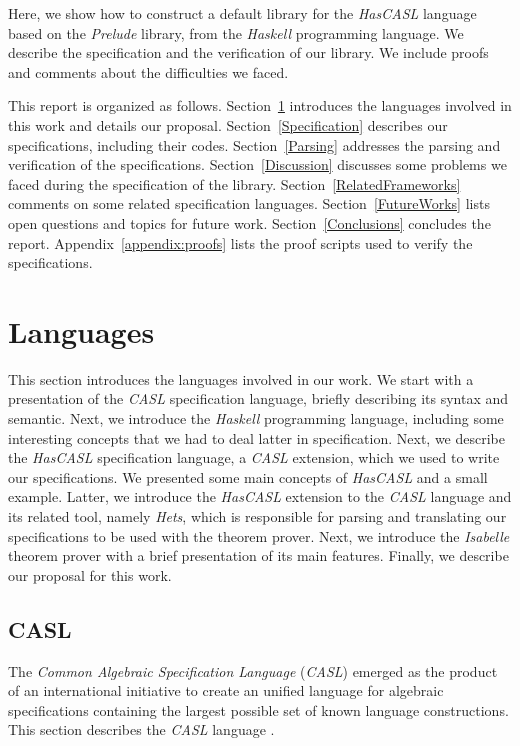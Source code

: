 \documentclass[12pt,twoside]{article}
\numberwithin{spec}{subsection}
\numberwithin{proof}{subsection}
\numberwithin{figure}{subsection}
\numberwithin{code}{subsection}
\begin{document}
Here, we show how to construct a default library for the \textit{HasCASL} language based on the \textit{Prelude} library, from the \textit{Haskell} programming language. We describe the specification and the verification of our library. We include proofs and comments about the difficulties we faced.

This report is organized as follows. 
Section~\ref{Languages} introduces the languages involved in this work and details our proposal.
Section~\ref{Specification} describes our specifications, including their codes.
Section~\ref{Parsing} addresses the parsing and verification of the specifications.
Section~\ref{Discussion} discusses some problems we faced during the specification of the library.
Section~\ref{RelatedFrameworks} comments on some related specification languages.
Section~\ref{FutureWorks} lists open questions and topics for future work.
Section~\ref{Conclusions} concludes the report.
Appendix~\ref{appendix:proofs} lists the proof scripts used to verify the specifications.

\section{Languages}\label{Languages}
This section introduces the languages involved in our work. We start with a presentation of the \textit{CASL} specification language, briefly describing its syntax and semantic. Next, we introduce the \textit{Haskell} programming language, including some interesting concepts that we had to deal latter in specification. Next, we describe the \textit{HasCASL} specification language, a \textit{CASL} extension, which we used to write our specifications. We presented some main concepts of \textit{HasCASL} and a small example. Latter, we introduce the \textit{HasCASL} extension to the \textit{CASL} language and its related tool, namely \textit{Hets}, which is responsible for parsing and translating our specifications to be used with the theorem prover. Next, we introduce the \textit{Isabelle} theorem prover with a brief presentation of its main features. Finally, we describe our proposal for this work.


\subsection{CASL}
The \textit{Common Algebraic Specification Language} (\textit{CASL}) emerged as the product of an international initiative to create an unified language for algebraic specifications containing  the largest possible set of known language constructions. This section describes the \textit{CASL} language \citep{Astesiano2002}.
\end{document}
